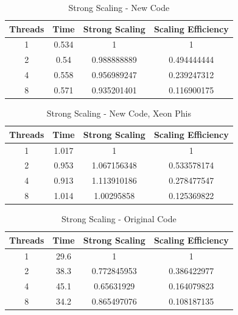 \documentclass{article}
\begin{document}
\begin{table}[here]
 \centering
 \begin{tabular}{ | c | c | c | c | }
 \hline
 Threads & Time & Strong Scaling & Scaling Efficiency \\ \hline
1 &	0.534 &	1 &	1 \\
2 &	0.54  &	0.988888889 &	0.494444444 \\
4 &	0.558 &	0.956989247 &	0.239247312 \\
8 &	0.571 &	0.935201401 &	0.116900175 \\ \hline
\end{tabular}
 \caption{Strong Scaling - New Code}
 \label{table:ss_n}
\end{table}
\begin{table}[here]
 \centering
  \begin{tabular}{ | c | c | c | c | }
 \hline
 Threads & Time & Strong Scaling & Scaling Efficiency \\ \hline
1 &	1.017 &	1 &	1 \\
2 &	0.953  &	1.067156348	& 0.533578174 \\
4 &	0.913 &	1.113910186	& 0.278477547 \\
8 &	1.014 &	1.00295858	& 0.125369822 \\ \hline
\end{tabular}
 \caption{Strong Scaling - New Code, Xeon Phis}
 \label{table:ss_xp}
\end{table}
\clearpage
\begin{table}[here]
 \centering
  \begin{tabular}{ | c | c | c | c | }
 \hline
 Threads & Time & Strong Scaling & Scaling Efficiency \\ \hline
1	& 29.6	& 1	& 1 \\
2	& 38.3 & 0.772845953 &	0.386422977 \\
4	& 45.1 & 0.65631929	 & 0.164079823 \\
8	& 34.2 & 0.865497076 &	0.108187135 \\ \hline
\end{tabular}
 \caption{Strong Scaling - Original Code}
 \label{table:ss_oc}
\end{table}
\end{document}
